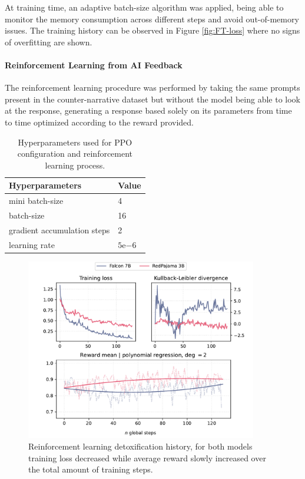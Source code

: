 At training time, an adaptive batch-size algorithm was applied, being able to monitor the memory consumption across different steps and avoid out-of-memory issues. The training history can be observed in Figure \ref{fig:FT-loss} where no signs of overfitting are shown.

\paragraph{Reinforcement Learning from AI Feedback} The reinforcement learning procedure was performed by taking the same prompts present in the counter-narrative dataset but without the model being able to look at the response, generating a response based solely on its parameters from time to time optimized according to the reward provided.

\begin{table}[h]
\centering
\begin{tabular}{ll}
\toprule
\textbf{Hyperparameters} & \textbf{Value} \\ 
\midrule
mini batch-size & 4 \\
batch-size & 16 \\
gradient accumulation steps & 2 \\ 
learning rate & $5\mathrm{e}{-6}$ \\ 
\bottomrule
\end{tabular}
\caption{Hyperparameters used for PPO configuration and reinforcement learning process.}
\label{tab:RL-params}
\end{table}

\begin{figure}[h]
    \centering
    \includegraphics[width=0.9\textwidth]{Figs/RL-stats.pdf}
    \caption{Reinforcement learning detoxification history, for both models training loss decreased while average reward slowly increased over the total amount of training steps.}
    \label{fig:RL-stats}
\end{figure}

